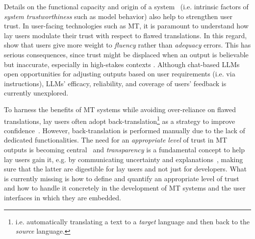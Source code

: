 Details on the functional capacity and origin of a system~\citep{davis-1979-applications} (i.e. intrinsic factors of \emph{system trustworthiness} such as model behavior) also help to strengthen user trust.
In user-facing technologies such as MT, it is paramount to understand how lay users  
modulate their trust with respect to flawed translations.
In this regard, 
\citet{martindale-carpuat-2018-fluency} 
show that users give more weight to \emph{fluency} rather than \emph{adequacy} errors. This has serious consequences, since trust might be displaced when an output is believable but inaccurate, especially in high-stakes contexts 
\citep{mehandru-etal-2023-physician}. Although chat-based LLMs open opportunities for adjusting outputs based on user requirements 
(i.e. via instructions), 
LLMs' efficacy, reliability, and coverage of users' feedback is currently unexplored.

To harness the benefits of MT systems while avoiding over-reliance on flawed translations, lay users often adopt 
back-translation\footnote{i.e. automatically translating a text to a \emph{target} language and then back to the \emph{source} language.} as a strategy to improve confidence~\citep{zouhar-etal-2021-backtranslation,mehandru-etal-2023-physician}. However, 
back-translation is performed manually due to the lack of dedicated functionalities. 
The need for an \emph{appropriate level} of trust in MT outputs is becoming central~\citep{martindale-carpuat-2018-fluency,deng2022generalpurposemachinetranslation} and \emph{transparency} is a fundamental concept to help lay users gain it, e.g. by communicating uncertainty and explanations~\citep{liao2023aitransparencyagellms}, making sure that the latter are 
digestible for lay users and not just for developers. What is currently missing is how to define and quantify an appropriate level of trust and how to handle it concretely in the development of MT systems and the user interfaces in which they are embedded.